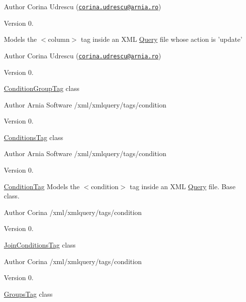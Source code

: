 \begin{DoxyAuthor}{Author}
Corina Udrescu (\href{mailto:corina.udrescu@arnia.ro}{\tt corina.\+udrescu@arnia.\+ro})  
\end{DoxyAuthor}
\begin{DoxyVersion}{Version}
0.
\end{DoxyVersion}
Models the $<$column$>$ tag inside an X\+M\+L \hyperlink{classQuery}{Query} file whose action is 'update'

\begin{DoxyAuthor}{Author}
Corina Udrescu (\href{mailto:corina.udrescu@arnia.ro}{\tt corina.\+udrescu@arnia.\+ro})  
\end{DoxyAuthor}
\begin{DoxyVersion}{Version}
0.
\end{DoxyVersion}
\hyperlink{classConditionGroupTag}{Condition\+Group\+Tag} class

\begin{DoxyAuthor}{Author}
Arnia Software /xml/xmlquery/tags/condition 
\end{DoxyAuthor}
\begin{DoxyVersion}{Version}
0.
\end{DoxyVersion}
\hyperlink{classConditionsTag}{Conditions\+Tag} class

\begin{DoxyAuthor}{Author}
Arnia Software /xml/xmlquery/tags/condition 
\end{DoxyAuthor}
\begin{DoxyVersion}{Version}
0.
\end{DoxyVersion}
\hyperlink{classConditionTag}{Condition\+Tag} Models the $<$condition$>$ tag inside an X\+M\+L \hyperlink{classQuery}{Query} file. Base class.

\begin{DoxyAuthor}{Author}
Corina /xml/xmlquery/tags/condition 
\end{DoxyAuthor}
\begin{DoxyVersion}{Version}
0.
\end{DoxyVersion}
\hyperlink{classJoinConditionsTag}{Join\+Conditions\+Tag} class

\begin{DoxyAuthor}{Author}
Corina /xml/xmlquery/tags/condition 
\end{DoxyAuthor}
\begin{DoxyVersion}{Version}
0.
\end{DoxyVersion}
\hyperlink{classGroupsTag}{Groups\+Tag} class

